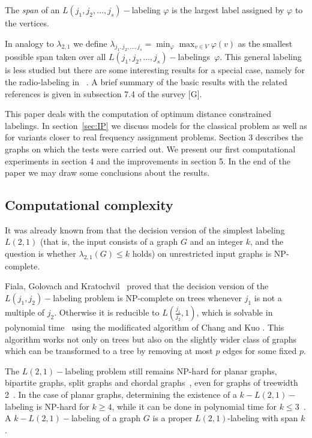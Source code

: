 \documentclass[smallextended]{svjour3}
\begin{document}
The \emph{span} of an $L(j_1,j_2,\ldots ,j_{s})-$labeling 
$\varphi$ is the largest label assigned by $\varphi$ to the vertices. 

In analogy to $\lambda_{2,1}$ we define $\lambda_{j_1,j_2,\ldots ,j_{s}}=\min_{\varphi}\max_{v\in V}\varphi(v)$ as the smallest possible span taken over all $L(j_1,j_2,\ldots ,j_{s})-$labelings~$\varphi$. 
This general labeling is less studied but there are some interesting results for a special case, 
namely for the radio-labeling in ~\cite{CEHZ,L,LMZ,HT}. A brief summary of the basic results with the related references is given in subsection 7.4 of the survey [G].

This paper deals with the computation of optimum distance constrained labelings. 
In section~\ref{sec:IP} we discuss models for the classical problem as 
well as for variants closer to real frequency assignment problems. Section 3 describes the graphs on which the tests were carried out. We present our first computational experiments in section 4 and the improvements in section 5. In the end of the paper we may draw some conclusions about the results.




\subsection{Computational complexity} 

It was already known from \cite{GY92} that the decision version of the simplest labeling $L(2,1)$ (that is, the input consists of a graph $G$ and an integer $k$, and the question is whether $\lambda_{2,1}(G)\leq k$ holds) on unrestricted input graphs is NP-complete. 

Fiala, Golovach and Kratochvil~\cite{7} proved that the decision version of the $L(j_{1},j_{2})-$labeling problem is NP-complete on trees whenever $j_{1}$ is not a multiple of $j_{2}$. Otherwise it is reducible to $L(\frac{j_{1}}{j_{2}},1)$, which is solvable in polynomial time~\cite{8} using the modificated algorithm of Chang and Kuo \cite{9}. This algorithm works not only on trees but also on the slightly wider class of graphs which can be transformed to a tree by removing at most $p$ edges for some fixed $p$. 

The $L(2,1)-$labeling problem still remains NP-hard for planar graphs, bipartite graphs, split graphs and chordal graphs~\cite{10}, even for graphs of treewidth 2~\cite{11}. In the case of planar graphs, determining the existence of a $k-L(2,1)-$labeling is NP-hard for $k\geq4$, while it can be done in polynomial time for $k\leq3$~\cite{12}. A $k-L(2,1)-$labeling of a graph $G$ is a proper  $L(2,1)$-labeling with span $k$. 
\end{document}
